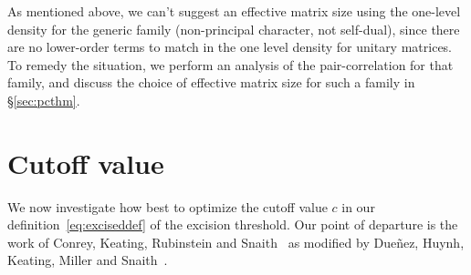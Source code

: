 \documentclass[11pt,reqno]{amsart} \usepackage{fullpage}
\numberwithin{equation}{section}
\begin{document}
As mentioned above, we can't suggest an effective matrix size using the one-level density
for the generic family (non-principal character, not self-dual), since there are no
lower-order terms to match in the one level density for unitary matrices.
To remedy the situation, we perform an analysis of the pair-correlation for that family,
and discuss the choice of effective matrix size for such a family in \S\ref{sec:pcthm}.

\section{Cutoff value}\label{sec:cutoff}
We now investigate how best to optimize the cutoff value $c$ in our
definition~\eqref{eq:exciseddef} of the excision threshold. Our point of departure is the
work of Conrey, Keating, Rubinstein and Snaith~\cite{CKRS1,CKRS2} as
modified by Dueñez, Huynh, Keating, Miller and Snaith~\cite{DHKMS}.
\end{document}
